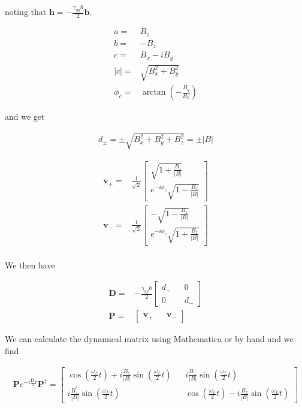 \documentclass[12pt]{article}
\newcommand{\bv}[1]{\boldsymbol{#1}}
\begin{document}
noting that $\bv{h} = -\frac{\gamma_{gy}\hbar}{2} \bv{b}$.

\begin{align}
a =& B_z \nonumber\\
b =& -B_z \nonumber\\
c =& B_x-iB_y \nonumber\\
|c| =& \sqrt{B_x^2 + B_y^2} \nonumber\\
\phi_c =& \arctan\left(-\frac{B_y}{B_x}\right)
\end{align}

and we get

\begin{align}
d_{\pm} = \pm \sqrt{B_x^2 + B_y^2+B_z^2} = \pm|B|
\end{align}

\begin{align}
\bv{v}_+ =& \frac{1}{\sqrt{2}}\begin{bmatrix}
\sqrt{1+\frac{B_z}{|B|}}\\
e^{-i\phi_c}\sqrt{1-\frac{B_z}{|B|}}
\end{bmatrix}\nonumber\\
\bv{v}_- =& \frac{1}{\sqrt{2}}\begin{bmatrix}
-\sqrt{1-\frac{B_z}{|B|}}\\
e^{-i\phi_c}\sqrt{1+\frac{B_z}{|B|}}
\end{bmatrix}\nonumber\\
\end{align}

We then have

\begin{align}
\bv{D} =& -\frac{\gamma_{gy}\hbar}{2}\begin{bmatrix}
d_+ && 0\\
0 && d_-
\end{bmatrix} \nonumber\\
\bv{P} =& \begin{bmatrix}
\bv{v}_+ && \bv{v_-}
\end{bmatrix}
\end{align}

We can calculate the dynamical matrix using Mathematica or by hand and we find

\begin{align}
\bv{P}e^{-i\frac{\bv{D}}{\hbar}t}\bv{P}^{\dag} = \begin{bmatrix}
\cos\left(\frac{\omega_L}{2} t\right) + i\frac{B_z}{|B|}\sin\left(\frac{\omega_L}{2}t\right) && i\frac{B_{\perp}}{|B|}\sin\left(\frac{\omega_L}{2} t\right)\\
i\frac{B_{\perp}^*}{|B|}\sin\left(\frac{\omega_L}{2} t\right) && \cos\left(\frac{\omega_L}{2}t\right) -i\frac{B_z}{|B|}\sin\left(\frac{\omega_L}{2}t\right)
\end{bmatrix}
\end{align}
\end{document}
